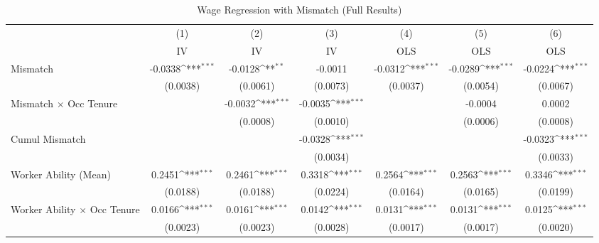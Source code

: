 {
\def\sym#1{\ifmmode^{#1}\else\(^{#1}\)\fi}
\begin{longtable}{l*{6}{c}}
\caption{Wage Regression with Mismatch (Full Results)}\\
\hline  \endfirsthead\hline  \endhead\hline  \endfoot\endlastfoot
                    &\multicolumn{1}{c}{(1)}&\multicolumn{1}{c}{(2)}&\multicolumn{1}{c}{(3)}&\multicolumn{1}{c}{(4)}&\multicolumn{1}{c}{(5)}&\multicolumn{1}{c}{(6)}\\
                    &\multicolumn{1}{c}{IV}&\multicolumn{1}{c}{IV}&\multicolumn{1}{c}{IV}&\multicolumn{1}{c}{OLS}&\multicolumn{1}{c}{OLS}&\multicolumn{1}{c}{OLS}\\
\hline  
Mismatch            &     -0.0338\sym{***}&     -0.0128\sym{**} &     -0.0011         &     -0.0312\sym{***}&     -0.0289\sym{***}&     -0.0224\sym{***}\\
                    &    (0.0038)         &    (0.0061)         &    (0.0073)         &    (0.0037)         &    (0.0054)         &    (0.0067)         \\
Mismatch $\times$ Occ Tenure&                     &     -0.0032\sym{***}&     -0.0035\sym{***}&                     &     -0.0004         &      0.0002         \\
                    &                     &    (0.0008)         &    (0.0010)         &                     &    (0.0006)         &    (0.0008)         \\
Cumul Mismatch      &                     &                     &     -0.0328\sym{***}&                     &                     &     -0.0323\sym{***}\\
                    &                     &                     &    (0.0034)         &                     &                     &    (0.0033)         \\
Worker Ability (Mean)&      0.2451\sym{***}&      0.2461\sym{***}&      0.3318\sym{***}&      0.2564\sym{***}&      0.2563\sym{***}&      0.3346\sym{***}\\
                    &    (0.0188)         &    (0.0188)         &    (0.0224)         &    (0.0164)         &    (0.0165)         &    (0.0199)         \\
Worker Ability $\times$ Occ Tenure&      0.0166\sym{***}&      0.0161\sym{***}&      0.0142\sym{***}&      0.0131\sym{***}&      0.0131\sym{***}&      0.0125\sym{***}\\
                    &    (0.0023)         &    (0.0023)         &    (0.0028)         &    (0.0017)         &    (0.0017)         &    (0.0020)         \\

\end{longtable}}
